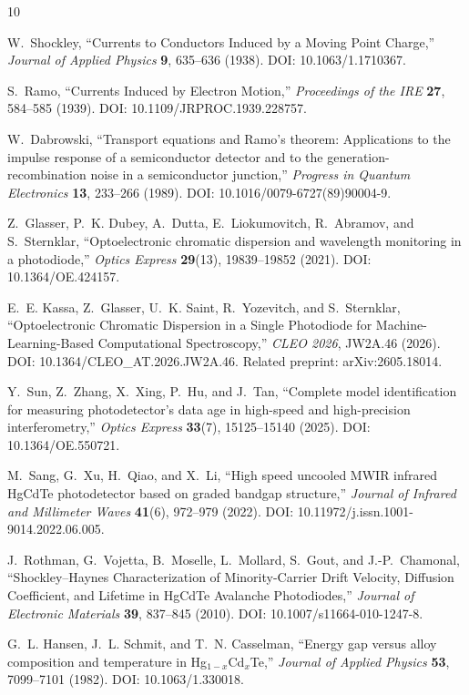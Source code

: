 \documentclass[11pt]{article}
\begin{document}
\begin{thebibliography}{10}

W.~Shockley, ``Currents to Conductors Induced by a Moving Point Charge,'' \emph{Journal of Applied Physics} \textbf{9}, 635--636 (1938). DOI: 10.1063/1.1710367.

S.~Ramo, ``Currents Induced by Electron Motion,'' \emph{Proceedings of the IRE} \textbf{27}, 584--585 (1939). DOI: 10.1109/JRPROC.1939.228757.

W.~Dabrowski, ``Transport equations and Ramo's theorem: Applications to the impulse response of a semiconductor detector and to the generation-recombination noise in a semiconductor junction,'' \emph{Progress in Quantum Electronics} \textbf{13}, 233--266 (1989). DOI: 10.1016/0079-6727(89)90004-9.

Z.~Glasser, P.~K. Dubey, A.~Dutta, E.~Liokumovitch, R.~Abramov, and S.~Sternklar, ``Optoelectronic chromatic dispersion and wavelength monitoring in a photodiode,'' \emph{Optics Express} \textbf{29}(13), 19839--19852 (2021). DOI: 10.1364/OE.424157.

E.~E. Kassa, Z.~Glasser, U.~K. Saint, R.~Yozevitch, and S.~Sternklar, ``Optoelectronic Chromatic Dispersion in a Single Photodiode for Machine-Learning-Based Computational Spectroscopy,'' \emph{CLEO 2026}, JW2A.46 (2026). DOI: 10.1364/CLEO\_AT.2026.JW2A.46. Related preprint: arXiv:2605.18014.

Y.~Sun, Z.~Zhang, X.~Xing, P.~Hu, and J.~Tan, ``Complete model identification for measuring photodetector's data age in high-speed and high-precision interferometry,'' \emph{Optics Express} \textbf{33}(7), 15125--15140 (2025). DOI: 10.1364/OE.550721.

M.~Sang, G.~Xu, H.~Qiao, and X.~Li, ``High speed uncooled MWIR infrared HgCdTe photodetector based on graded bandgap structure,'' \emph{Journal of Infrared and Millimeter Waves} \textbf{41}(6), 972--979 (2022). DOI: 10.11972/j.issn.1001-9014.2022.06.005.

J.~Rothman, G.~Vojetta, B.~Moselle, L.~Mollard, S.~Gout, and J.-P.~Chamonal, ``Shockley--Haynes Characterization of Minority-Carrier Drift Velocity, Diffusion Coefficient, and Lifetime in HgCdTe Avalanche Photodiodes,'' \emph{Journal of Electronic Materials} \textbf{39}, 837--845 (2010). DOI: 10.1007/s11664-010-1247-8.

G.~L. Hansen, J.~L. Schmit, and T.~N. Casselman, ``Energy gap versus alloy composition and temperature in Hg$_{1-x}$Cd$_x$Te,'' \emph{Journal of Applied Physics} \textbf{53}, 7099--7101 (1982). DOI: 10.1063/1.330018.


\end{thebibliography}
\end{document}
